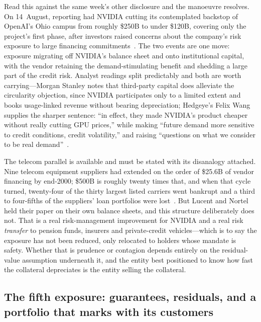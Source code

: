 Read this against the same week's other disclosure and the manoeuvre resolves. On 14~August, reporting had NVIDIA cutting its contemplated backstop of OpenAI's Ohio campus from roughly \$250B to under \$120B, covering only the project's first phase, after investors raised concerns about the company's risk exposure to large financing commitments~\cite{nvidia-backstop-cut}. The two events are one move: exposure migrating off NVIDIA's balance sheet and onto institutional capital, with the vendor retaining the demand-stimulating benefit and shedding a large part of the credit risk. Analyst readings split predictably and both are worth carrying---Morgan Stanley notes that third-party capital does alleviate the circularity objection, since NVIDIA participates only to a limited extent and books usage-linked revenue without bearing depreciation; Hedgeye's Felix Wang supplies the sharper sentence: ``in effect, they made NVIDIA's product cheaper without really cutting GPU prices,'' while making ``future demand more sensitive to credit conditions, credit volatility,'' and raising ``questions on what we consider to be real demand''~\cite{nvidia-500b-analysis}.

The telecom parallel is available and must be stated with its disanalogy attached. Nine telecom equipment suppliers had extended on the order of \$25.6B of vendor financing by end-2000; \$500B is roughly twenty times that, and when that cycle turned, twenty-four of the thirty largest listed carriers went bankrupt and a third to four-fifths of the suppliers' loan portfolios were lost~\cite{nvidia-500b-analysis}. But Lucent and Nortel held their paper on their own balance sheets, and this structure deliberately does not. That is a real risk-management improvement for NVIDIA and a real risk \emph{transfer} to pension funds, insurers and private-credit vehicles---which is to say the exposure has not been reduced, only relocated to holders whose mandate is safety. Whether that is prudence or contagion depends entirely on the residual-value assumption underneath it, and the entity best positioned to know how fast the collateral depreciates is the entity selling the collateral.

\subsection{The fifth exposure: guarantees, residuals, and a portfolio that marks with its customers}
\label{sec:guarantee-exposure}

